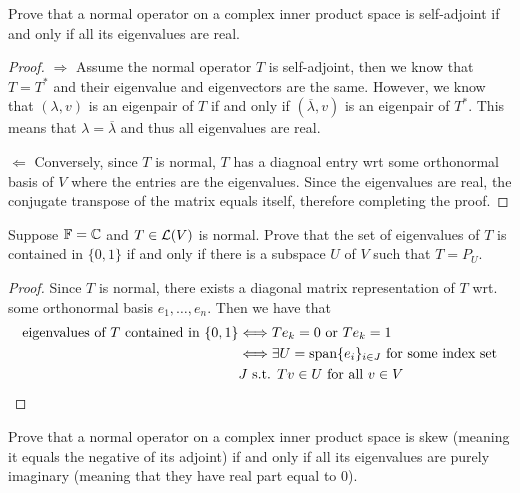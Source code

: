 \documentclass{extarticle}
\begin{document}

\newpage 
{}


\begin{problem}{1}
    Prove that a normal operator on a complex inner product space is self-adjoint if and only if 
    all its eigenvalues are real. 
\end{problem}

\begin{proof}
\(\Rightarrow\) Assume the normal operator \(T\) is self-adjoint, then we know that \(T = T^*\) and 
their eigenvalue and eigenvectors are the same. However, we know that \((\lambda, v)\) is an eigenpair 
of \(T\) if and only if \((\overline{\lambda}, v)\) is an eigenpair of \(T^*\). This means that 
\(\lambda = \overline{\lambda}\) and thus all eigenvalues are real. 

\(\Leftarrow\) Conversely, since \(T\) is normal, \(T\) has a diagnoal entry wrt some orthonormal 
basis of \(V\) where the entries are the eigenvalues. Since the eigenvalues are real, the conjugate transpose of 
the matrix equals itself, therefore completing the proof.
\end{proof}

\begin{problem}{3}
    Suppose \(\mathbb{F} = \mathbb{C}\) and \(T \in \mathcal{L}(V)\) is normal. Prove that the set of eigenvalues 
    of \(T\) is contained in \(\{0, 1\}\) if and only if there is a subspace \(U\) of \(V\) such 
    that \(T = P_U\). 
\end{problem}

\begin{proof}
Since \(T\) is normal, there exists a diagonal matrix representation of \(T\) wrt. some orthonormal 
basis \(e_1, \ldots, e_n\). Then we have that 
\begin{align*}
    \text{eigenvalues of } T \text{ contained in } \{0, 1\} 
    &\Longleftrightarrow Te_k = 0 \text{ or } T e_k = 1 \\ 
    &\Longleftrightarrow \exists U = \text{span}\{e_i\}_{i \in J} \text{ for some index set}\\ 
    &J \text{ s.t. } Tv \in U \text{ for all } v \in V 
\end{align*}
\end{proof}

\begin{problem}{4}
    Prove that a normal operator on a complex inner product space is skew (meaning it equals the negative 
    of its adjoint) if and only if all its eigenvalues are purely imaginary (meaning that they have 
    real part equal to 0).
\end{problem}
\end{document}
